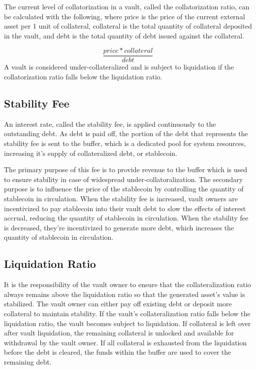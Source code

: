 \documentclass[12pt]{article}
\begin{document}
The current level of collatorization in a vault, called the collatorization ratio, can be calculated with the following, where price is the price of the current external asset per 1 unit of collateral, collateral is the total quantity of collateral deposited in the vault, and debt is the total quantity of debt issued against the collateral.

\begin{equation*}
	\frac{price * collateral}{debt}
\end{equation*}
A vault is considered under-collateralized and is subject to liquidation if the collatorization ratio falls below the liquidation ratio.



\subsection{Stability Fee}

An interest rate, called the stability fee, is applied continuously to the outstanding debt. As debt is paid off, the portion of the debt that represents the stability fee is sent to the buffer, which is a dedicated pool for system resources, increasing it's supply of collateralized debt, or stablecoin.

The primary purpose of this fee is to provide revenue to the buffer which is used to ensure stability in case of widespread under-collatoralization. The secondary purpose is to influence the price of the stablecoin by controlling the quantity of stablecoin in circulation. When the stability fee is increased, vault owners are incentivized to pay stablecoin into their vault debt to slow the effects of interest accrual, reducing the quantity of stablecoin in circulation. When the stability fee is decreased, they're incentivized to generate more debt, which increases the quantity of stablecoin in circulation.

\subsection{Liquidation Ratio}

It is the responsibility of the vault owner to ensure that the collateralization ratio always remains above the liquidation ratio so that the generated asset's value is stabilized. The vault owner can either pay off existing debt or deposit more collateral to maintain stability. If the vault's collateralization ratio falls below the liquidation ratio, the vault becomes subject to liquidation. If collateral is left over after vault liquidation, the remaining collateral is unlocked and available for withdrawal by the vault owner. If all collateral is exhausted from the liquidation before the debt is cleared, the funds within the buffer are used to cover the remaining debt.
\end{document}
